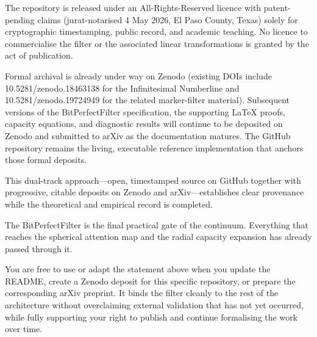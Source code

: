 The repository is released under an All-Rights-Reserved licence with patent-pending claims (jurat-notarised 4 May 2026, El Paso County, Texas) solely for cryptographic timestamping, public record, and academic teaching. No licence to commercialise the filter or the associated linear transformations is granted by the act of publication.

Formal archival is already under way on Zenodo (existing DOIs include 10.5281/zenodo.18463138 for the Infinitesimal Numberline and 10.5281/zenodo.19724949 for the related marker-filter material). Subsequent versions of the BitPerfectFilter specification, the supporting LaTeX proofs, capacity equations, and diagnostic results will continue to be deposited on Zenodo and submitted to arXiv as the documentation matures. The GitHub repository remains the living, executable reference implementation that anchors those formal deposits.

This dual-track approach—open, timestamped source on GitHub together with progressive, citable deposits on Zenodo and arXiv—establishes clear provenance while the theoretical and empirical record is completed.

The BitPerfectFilter is the final practical gate of the continuum. Everything that reaches the spherical attention map and the radial capacity expansion has already passed through it.

You are free to use or adapt the statement above when you update the README, create a Zenodo deposit for this specific repository, or prepare the corresponding arXiv preprint. It binds the filter cleanly to the rest of the architecture without overclaiming external validation that has not yet occurred, while fully supporting your right to publish and continue formalising the work over time.
